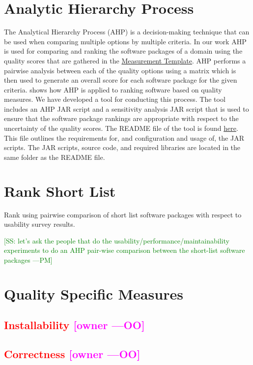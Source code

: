 \documentclass[letterpaper,cleveref]{lipics-v2019}
\newcommand{\authornote}[3]{\textcolor{#1}{[#3 ---#2]}}
\newcommand{\authornote}[3]{}
\newcommand{\oo}[1]{\authornote{magenta}{OO}{#1}} %
\newcommand{\pmi}[1]{\authornote{green}{PM}{#1}} %
\newcommand{\notdone}[1]{\textcolor{red}{#1}}
\theoremstyle{definition}
\begin{document}
\section{Analytic Hierarchy Process} \label{SecAHP}
The Analytical Hierarchy Process (AHP) is a decision-making technique that can be used when comparing multiple options by multiple criteria. In our work AHP is used for comparing and ranking the software packages of a domain using the quality scores that are gathered in the \href{https://github.com/smiths/AIMSS/blob/master/StateOfPractice/Methodology/Combined_MeasurementTemplate_EmpiricalMeasures.xlsx}{Measurement Template}. AHP performs a pairwise analysis between each of the quality options using a matrix which is then used to generate an overall score for each software package for the given criteria. \cite{SmithEtAl2016} shows how AHP is applied to ranking software based on quality measures. We have developed a tool for conducting this process. The tool includes an AHP JAR script and a sensitivity analysis JAR script that is used to ensure that the software package rankings are appropriate with respect to the uncertainty of the quality scores. The README file of the tool is found \href{https://github.com/smiths/AIMSS/blob/master/StateOfPractice/AHP2020/LBM/README.txt}{here}. This file outlines the requirements for, and configuration and usage of, the JAR scripts. The JAR scripts, source code, and required libraries are located in the same folder as the README file.

\section{Rank Short List} \label{SecRankShortList}
Rank using pairwise comparison of short list software packages with respect to usability survey results.

\pmi{SS: let's ask the people that do the usability/performance/maintainability experiments to do an AHP pair-wise comparison between the short-list software packages}

\section{Quality Specific Measures}

\subsection{\notdone{Installability} \oo{owner}}

\subsection{\notdone{Correctness} \oo{owner}}
\end{document}
